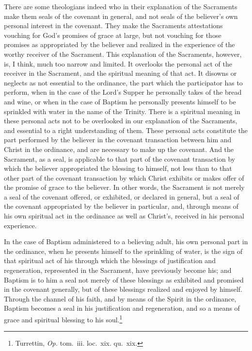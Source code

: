 \documentclass[
]{book}
\begin{document}
There are some theologians indeed who in their explanation of the Sacraments make them seals of the covenant in general, and not seals of the believer's own personal interest in the covenant. They make the Sacraments attestations vouching for God's promises of grace at large, but not vouching for those promises as appropriated by the believer and realized in the experience of the worthy receiver of the Sacrament. This explanation of the Sacraments, however, is, I think, much too narrow and limited. It overlooks the personal act of the receiver in the Sacrament, and the spiritual meaning of that act. It disowns or neglects as not essential to the ordinance, the part which the participator has to perform, when in the case of the Lord's Supper he personally takes of the bread and wine, or when in the case of Baptism he personally presents himself to be sprinkled with water in the name of the Trinity. There is a spiritual meaning in these personal acts not to be overlooked in our explanation of the Sacraments, and essential to a right understanding of them. These personal acts constitute the part performed by the believer in the covenant transaction between him and Christ in the ordinance, and are necessary to make up the covenant. And the Sacrament, as a seal, is applicable to that part of the covenant transaction by which the believer appropriated the blessing to himself, not less than to that other part of the covenant transaction by which Christ exhibits or makes offer of the promise of grace to the believer. In other words, the Sacrament is not merely a seal of the covenant offered, or exhibited, or declared in general, but a seal of the covenant appropriated by the believer in particular, and, through means of his own spiritual act in the ordinance as well as Christ's, received in his personal experience.

In the case of Baptism administered to a believing adult, his own personal part in the ordinance, when he presents himself to the sprinkling of water, is the sign of that spiritual act of his through which the blessings of justification and regeneration, represented in the Sacrament, have previously become his; and Baptism is to him a seal not merely of these blessings as exhibited and promised in the covenant generally, but of these blessings realized and enjoyed by himself. Through the channel of his faith, and by means of the Spirit in the ordinance, Baptism becomes a seal in his justification and regeneration, and so a means of grace and spiritual blessing to his soul.\footnote{Turrettin, \emph{Op.} tom.~iii. loc.~xix. qu.~xix.}
\end{document}
